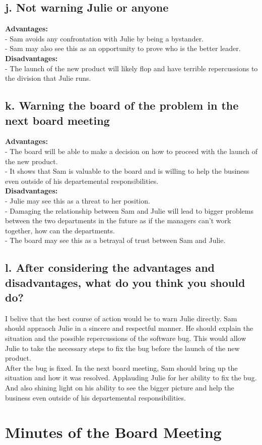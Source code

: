 \documentclass{article}
\begin{document}
\subsection{j. Not warning Julie or anyone}
\textbf{Advantages:} \\
- Sam avoids any confrontation with Julie by being a bystander. \\
- Sam may also see this as an opportunity to prove who is the better leader. \\

\textbf{Disadvantages:} \\
- The launch of the new product will likely flop and have terrible repercussions to the division that Julie runs. \\

\subsection{k. Warning the board of the problem in the next board meeting}
\textbf{Advantages:} \\
- The board will be able to make a decision on how to proceed with the launch of the new product. \\
- It shows that Sam is valuable to the board and is willing to help the business even outside of his departemental responsibilities. \\

\textbf{Disadvantages:} \\
- Julie may see this as a threat to her position. \\
- Damaging the relationship between Sam and Julie will lead to bigger problems between the two departments in the future as if the managers can't work together, how can the departments. \\
- The board may see this as a betrayal of trust between Sam and Julie. \\

\subsection{l. After considering the advantages and disadvantages, what do you think you should do?}
I belive that the best course of action would be to warn Julie directly.
Sam should appraoch Julie in a sincere and respectful manner. He should explain the situation and the possible repercussions of the software bug. This would allow Julie to take the necessary steps to fix the bug before the launch of the new product. \\

After the bug is fixed. In the next board meeting, Sam should bring up the situation and how it was resolved. Applauding Julie for her ability to fix the bug. And also shining light on his ability to see the bigger picture and help the business even outside of his departemental responsibilities. \\

\section{Minutes of the Board Meeting}
\end{document}
